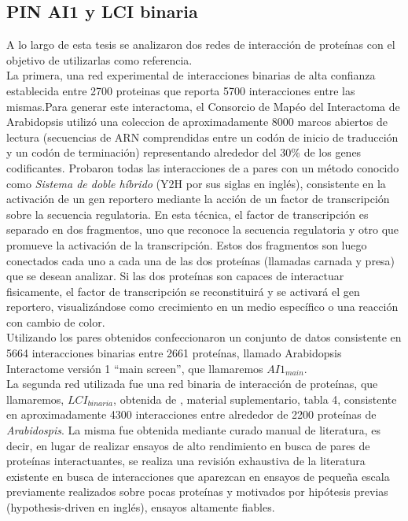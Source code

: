 \subsection{PIN AI1 y LCI binaria}
A lo largo de esta tesis se analizaron dos redes de interacción de proteínas con el objetivo de utilizarlas como referencia.\\
La primera, una red experimental de interacciones binarias de alta confianza establecida entre 2700 proteinas \cite{Hahn2013} que
reporta 5700 interacciones entre las mismas.Para generar este interactoma, el Consorcio de Mapéo del Interactoma de Arabidopsis utilizó una coleccion de aproximadamente 8000 marcos abiertos de lectura (secuencias de ARN comprendidas entre un codón de inicio de traducción y un codón de terminación) representando alrededor del 30\% de los genes codificantes. Probaron todas las interacciones de a pares con un método conocido como \textit{Sistema de doble híbrido} (Y2H por sus siglas en inglés), consistente en la activación de un gen reportero mediante la acción de un factor de transcripción sobre la secuencia regulatoria. En esta técnica, el factor de transcripción es separado en dos fragmentos, uno que reconoce la secuencia regulatoria y otro que promueve la activación de la transcripción. Estos dos fragmentos son luego conectados cada uno a cada una de las dos proteínas (llamadas carnada y presa) que se desean analizar. Si las dos proteínas son capaces de interactuar fisicamente, el factor de transcripción se reconstituirá y se activará el gen reportero, visualizándose como crecimiento en un medio específico o una reacción con cambio de color.\cite{Bruckner2009}\\
Utilizando los pares obtenidos confeccionaron un conjunto de datos consistente en 5664 interacciones binarias entre 2661 proteínas, llamado Arabidopsis Interactome versión 1 ``main screen'', que llamaremos $AI1_{main}$.\\
La segunda red utilizada fue una red binaria de interacción de proteínas, que llamaremos, $LCI_{binaria}$, obtenida de \cite{Hahn2013}, material suplementario, tabla 4, consistente en aproximadamente 4300 interacciones entre alrededor de 2200 proteínas de \textit{Arabidospis}. La misma fue obtenida mediante curado manual de literatura, es decir, en lugar de realizar ensayos de alto rendimiento en busca de pares de proteínas interactuantes, se realiza una revisión exhaustiva de la literatura existente en busca de interacciones que aparezcan en ensayos de pequeña escala previamente realizados sobre pocas proteínas y motivados por hipótesis previas (hypothesis-driven en inglés), ensayos altamente fiables.\cite{Cusick2009}\\
